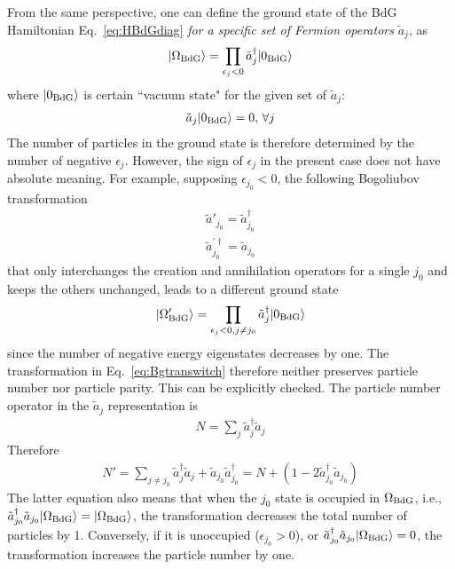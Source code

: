 From the same perspective, one can define the ground state of the BdG Hamiltonian Eq.~\ref{eq:HBdGdiag} \emph{for a specific set of Fermion operators} $\tilde{a}_j$, as
\begin{eqnarray}
	|\Omega_{\rm BdG}\rangle = \prod_{\epsilon_j < 0} \tilde{a}_j^\dag | 0_{\rm BdG} \rangle
\end{eqnarray}
where $| 0_{\rm BdG} \rangle$ is certain ``vacuum state" for the given set of $\tilde{a}_j$:
\begin{eqnarray}
	\tilde{a}_j | 0_{\rm BdG} \rangle = 0,\, \forall j
\end{eqnarray}
The number of particles in the ground state is therefore determined by the number of negative $\epsilon_j$. However, the sign of $\epsilon_j$ in the present case does not have absolute meaning. For example, supposing $\epsilon_{j_0}<0$, the following Bogoliubov transformation
\begin{eqnarray}\label{eq:Bgtranswitch}
	\tilde{a}'_{j_0} = \tilde{a}_{j_0}^\dag \\\nonumber
	{\tilde{a}}^{\prime \dag}_{j_0} = \tilde{a}_{j_0}
\end{eqnarray}
that only interchanges the creation and annihilation operators for a single $j_0$ and keeps the others unchanged, leads to a different ground state
\begin{eqnarray}
	|\Omega'_{\rm BdG}\rangle = \prod_{\epsilon_j < 0, j\neq j_0} \tilde{a}_j^\dag | 0_{\rm BdG} \rangle
\end{eqnarray}
since the number of negative energy eigenstates decreases by one. The transformation in Eq.~\ref{eq:Bgtranswitch} therefore neither preserves particle number nor particle parity. This can be explicitly checked. The particle number operator in the $\tilde{a}_j$ representation is
\begin{eqnarray}
	N = \sum_{j} \tilde{a}_j^\dag \tilde{a}_j
\end{eqnarray}
Therefore
\begin{eqnarray}
	N' = \sum_{j\neq j_0} \tilde{a}_j^\dag \tilde{a}_j + \tilde{a}_{j_0} \tilde{a}^\dag_{j_0} = N + (1-2 \tilde{a}_{j_0}^\dag \tilde{a}_{j_0})
\end{eqnarray}
The latter equation also means that when the $j_0$ state is occupied in $\Omega_{\rm BdG}$, i.e., $\tilde{a}_{j_0}^\dag \tilde{a}_{j_0} |\Omega_{\rm BdG}\rangle = |\Omega_{\rm BdG}\rangle$, the transformation decreases the total number of particles by 1. Conversely, if it is unoccupied ($\epsilon_{j_0} > 0$), or $\tilde{a}_{j_0}^\dag \tilde{a}_{j_0} |\Omega_{\rm BdG}\rangle = 0$, the transformation increases the particle number by one.


